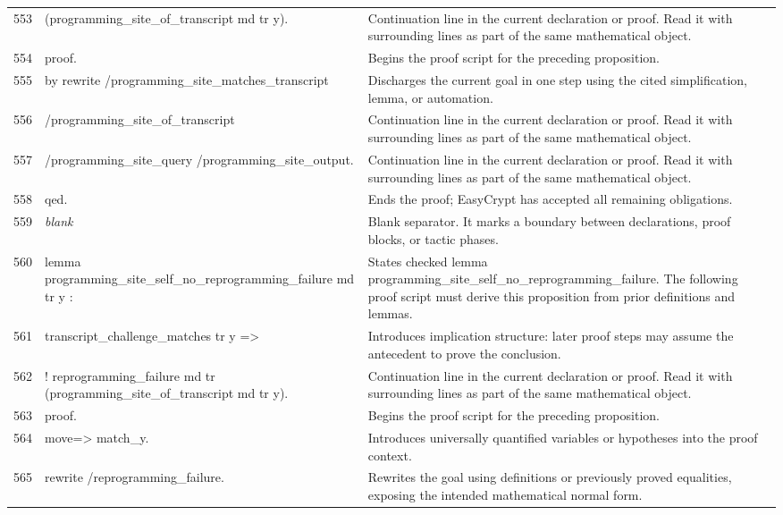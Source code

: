 \documentclass[10pt]{article}
\begin{document}
\begin{longtable}{r L{0.53\textwidth} L{0.37\textwidth}}
553 & {\ttfamily\scriptsize     (programming\_site\_of\_transcript md tr y).} & Continuation line in the current declaration or proof.  Read it with surrounding lines as part of the same mathematical object. \\
554 & {\ttfamily\scriptsize proof.} & Begins the proof script for the preceding proposition. \\
555 & {\ttfamily\scriptsize by rewrite /programming\_site\_matches\_transcript} & Discharges the current goal in one step using the cited simplification, lemma, or automation. \\
556 & {\ttfamily\scriptsize            /programming\_site\_of\_transcript} & Continuation line in the current declaration or proof.  Read it with surrounding lines as part of the same mathematical object. \\
557 & {\ttfamily\scriptsize            /programming\_site\_query /programming\_site\_output.} & Continuation line in the current declaration or proof.  Read it with surrounding lines as part of the same mathematical object. \\
558 & {\ttfamily\scriptsize qed.} & Ends the proof; EasyCrypt has accepted all remaining obligations. \\
559 & {\ttfamily\scriptsize \emph{blank}} & Blank separator.  It marks a boundary between declarations, proof blocks, or tactic phases. \\
560 & {\ttfamily\scriptsize lemma programming\_site\_self\_no\_reprogramming\_failure md tr y :} & States checked lemma programming\_site\_self\_no\_reprogramming\_failure.  The following proof script must derive this proposition from prior definitions and lemmas. \\
561 & {\ttfamily\scriptsize   transcript\_challenge\_matches tr y =>} & Introduces implication structure: later proof steps may assume the antecedent to prove the conclusion. \\
562 & {\ttfamily\scriptsize   ! reprogramming\_failure md tr (programming\_site\_of\_transcript md tr y).} & Continuation line in the current declaration or proof.  Read it with surrounding lines as part of the same mathematical object. \\
563 & {\ttfamily\scriptsize proof.} & Begins the proof script for the preceding proposition. \\
564 & {\ttfamily\scriptsize move=> match\_y.} & Introduces universally quantified variables or hypotheses into the proof context. \\
565 & {\ttfamily\scriptsize rewrite /reprogramming\_failure.} & Rewrites the goal using definitions or previously proved equalities, exposing the intended mathematical normal form. \\

\end{longtable}
\end{document}

